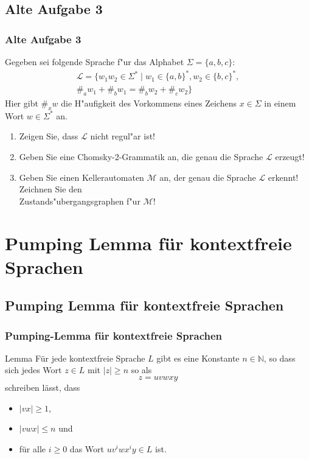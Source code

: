 \subsection{Alte Aufgabe 3}
\begin{frame}
	\frametitle{Alte Aufgabe 3}
	Gegeben sei folgende Sprache f"ur das Alphabet $\Sigma = \{a,b,c\}$:
	\begin{multline*}
		\mathcal{L} = \{w_1w_2 \in \Sigma^* \; | \; w_1 \in \{a,b\}^*,w_2 \in \{b,c\}^*,\\
		\#_a w_1 + \#_b w_1 = \#_b w_2 + \#_c w_2\}
	\end{multline*}
	Hier gibt $\#_x w$ die H"aufigkeit des Vorkommens eines Zeichens $x \in \Sigma$ in
	einem Wort $w \in \Sigma^*$ an.
	\begin{enumerate}
		\item Zeigen Sie, dass $\mathcal{L}$ nicht regul"ar ist!
		\item Geben Sie eine Chomsky-2-Grammatik an, die genau die Sprache $\mathcal{L}$
		erzeugt!
		\item Geben Sie einen Kellerautomaten $\mathcal{M}$ an, der genau die Sprache
		$\mathcal{L}$ erkennt! Zeichnen Sie den\\
		Zustands"ubergangsgraphen f"ur $\mathcal{M}$!
	\end{enumerate}
\end{frame}

\section{Pumping Lemma für kontextfreie Sprachen}
\subsection{Pumping Lemma für kontextfreie Sprachen}
\begin{frame}
	\frametitle{Pumping-Lemma für kontextfreie Sprachen}
	\begin{exampleblock}{Lemma}
		Für jede kontextfreie Sprache $L$ gibt es eine Konstante $n \in \mathbb{N}$,
		so dass sich jedes Wort $z \in L$ mit $|z| \geq n$ so als
		$$ z = uvwxy $$
		schreiben lässt, dass
		\begin{itemize}
			\item $|vx| \geq 1$,
			\item $|vwx| \leq n$ und
			\item für alle $i \geq 0$ das Wort $uv^iwx^iy \in L$ ist.
		\end{itemize}
	\end{exampleblock}
\end{frame}

